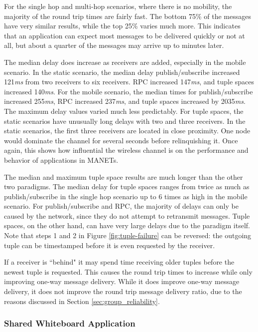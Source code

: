 For the single hop and multi-hop scenarios, where there is no mobility, the majority of the round trip times are fairly fast. The bottom 75\% of the messages have very similar results, while the top 25\% varies much more. This indicates that an application can expect most messages to be delivered quickly or not at all, but about a quarter of the messages may arrive up to minutes later.

The median delay does increase as receivers are added, especially in the mobile scenario. In the static scenario, the median delay publish/subscribe increased 121\textit{ms} from two receivers to six receivers. RPC increased 147\textit{ms}, and tuple spaces increased 140\textit{ms}. For the mobile scenario, the median times for publish/subscribe increased 255\textit{ms}, RPC increased 237\textit{ms}, and tuple spaces increased by 2035\textit{ms}. The maximum delay values varied much less predictably. For tuple spaces, the static scenarios have unusually long delays with two and three receivers. In the static scenarios, the first three receivers are located in close proximity. One node would dominate the channel for several seconds before relinquishing it. Once again, this shows how influential the wireless channel is on the performance and behavior of applications in MANETs.

The median and maximum tuple space results are much longer than the other two paradigms. The median delay for tuple spaces ranges from twice as much as publish/subscribe in the single hop scenario up to 6 times as high in the mobile scenario. For publish/subscribe and RPC, the majority of delays can only be caused by the network, since they do not attempt to retransmit messages. Tuple spaces, on the other hand, can have very large delays due to the paradigm itself. Note that steps 1 and 2 in Figure \ref{fig:tuple-failure} can be reversed: the outgoing tuple can be timestamped before it is even requested by the receiver.

If a receiver is ``behind" it may spend time receiving older tuples before the newest tuple is requested. This causes the round trip times to increase while only improving one-way message delivery. While it does improve one-way message delivery, it does not improve the round trip message delivery ratio, due to the reasons discussed in Section \ref{sec:group_reliability}.

\subsubsection{Shared Whiteboard Application}


